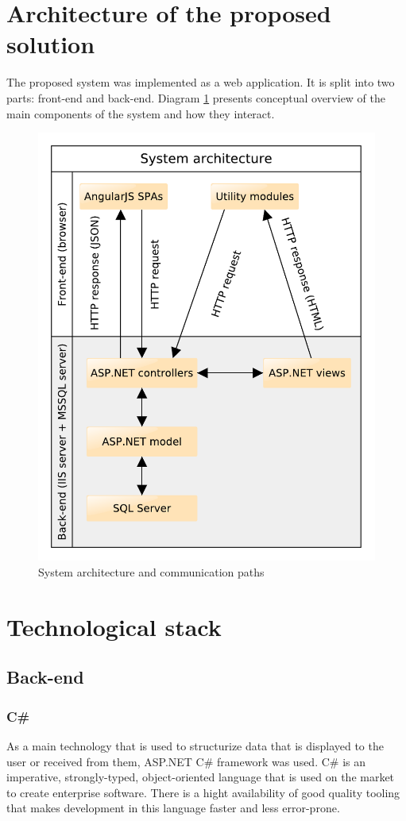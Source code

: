 \documentclass[12pt, twoside, openany]{report}
\theoremstyle{definition}
\begin{document}
\section{Architecture of the proposed solution}
The proposed system was implemented as a web application. It is split into two parts: front-end and back-end. Diagram \ref{fig:architecture-diagram} presents conceptual overview of the main components of the system and how they interact.
\begin{figure}
	\centering
	\includegraphics[width=0.7\linewidth, trim={0 0cm 0cm 0cm},clip]{architecture}
	\caption{System architecture and communication paths
		\label{fig:architecture-diagram}
	}
\end{figure}
\section{Technological stack}

\subsection{Back-end}
\subsubsection{C\#}
As a main technology that is used to structurize data that is displayed to the user or received from them, ASP.NET C\# framework was used.
C\# is an imperative, strongly-typed, object-oriented language that is used on the market to create enterprise software. There is a hight availability of good quality tooling that makes development in this language faster and less error-prone.
\end{document}

